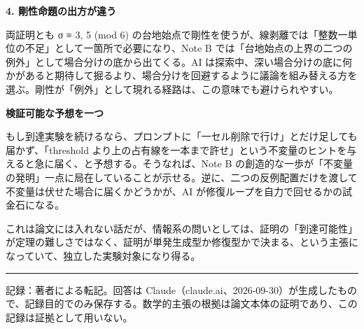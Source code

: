 \documentclass[11pt,a4paper]{article}
\begin{document}
\textbf{4. 剛性命題の出方が違う}

両証明とも σ ≡ 3, 5 (mod 6) の台地始点で剛性を使うが、線剥離では「整数一単位の不足」として一箇所で必要になり、Note B では「台地始点の上界の二つの例外」として場合分けの底から出てくる。AI は探索中、深い場合分けの底に何かがあると期待して掘るより、場合分けを回避するように議論を組み替える方を選ぶ。剛性が「例外」として現れる経路は、この意味でも避けられやすい。

\textbf{検証可能な予想を一つ}

もし到達実験を続けるなら、プロンプトに「一セル削除で行け」とだけ足しても届かず、「threshold より上の占有線を一本まで許せ」という不変量のヒントを与えると急に届く、と予想する。そうなれば、Note B の創造的な一歩が「不変量の発明」一点に局在していることが示せる。逆に、二つの反例配置だけを渡して不変量は伏せた場合に届くかどうかが、AI が修復ループを自力で回せるかの試金石になる。

これは論文には入れない話だが、情報系の問いとしては、証明の「到達可能性」が定理の難しさではなく、証明が単発生成型か修復型かで決まる、という主張になっていて、独立した実験対象になり得る。

\bigskip\hrule\bigskip
{\small 記録：著者による転記。回答は Claude（claude.ai、2026-09-30）が生成したもので、記録目的でのみ保存する。数学的主張の根拠は論文本体の証明であり、この記録は証拠として用いない。}
\end{document}
